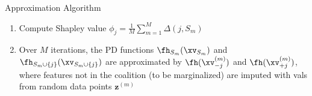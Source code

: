 \documentclass[10pt,compress,t,notes=noshow, xcolor=table]{beamer}
\newcommand{\Sm}{S_m}%
\newcommand{\Smj}{\Sm \cup \{j\}}
\newcommand{\minusSmj}{- \{\Sm \cup \{j\} \} }
\newcommand{\xjp}{\xv_{+j}^{(m)}}
\newcommand{\xjm}{\xv_{-j}^{(m)}}
\begin{document}
\begin{framev}[align=top]{Approximation Algorithm }
\begin{enumerate}[<+->]
\begin{enumerate}
\item Construct two hybrid obs. by combining values from $\xv$ and {\color{blue} $\mathbf{z}^{(m)}$}:
\item Compute marginal contribution $\Delta(j, \Sm) = \fh(\xjp) - \fh(\xjm)$ %
\end{enumerate}
\item Compute Shapley value $\phi_j = \frac{1}{M}\sum_{m=1}^M \Delta(j, \Sm)$ %
\item[$\leadsto$] Over $M$ iterations, the PD functions $\fh_{\Sm}(\xv_{\Sm})$ and $\fh_{\Smj}(\xv_{\Smj})$ are approximated by $\fh(\xjm)$ and $\fh(\xjp)$, where features not in the coalition (to be marginalized) are imputed with vals from random data points {\color{blue} $\mathbf{z}^{(m)}$}
\end{enumerate}
   
   
\end{framev}
\end{document}
